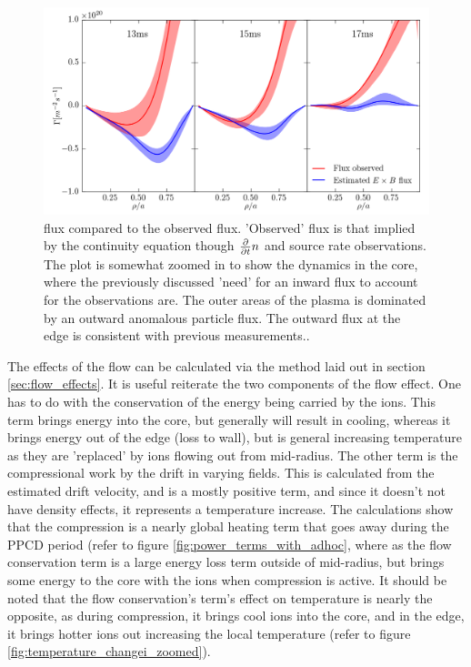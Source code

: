 \begin{figure}
    \centering
    \includegraphics[width=\linewidth]{ion_transport_results/flux_comp.png}
    \caption[\ecb flux compared to measured flux]{\ecb flux compared to the observed flux. 'Observed' flux is that implied by the continuity equation though $\frac{\partial}{\partial t} n$ and source rate observations. The plot is somewhat zoomed in to show the dynamics in the core, where the previously discussed 'need' for an inward flux to account for the observations are. The outer areas of the plasma is dominated by an outward anomalous particle flux. The outward flux at the edge is consistent with previous measurements.\cite{Lanier2001a}. }
    \label{fig:eb_flux}
\end{figure}
The effects of the flow can be calculated via the method laid out in section \ref{sec:flow_effects}. It is useful reiterate the two components of the flow effect. One has to do with the conservation of the energy being carried by the ions. This term brings energy into the core, but generally will result in cooling, whereas it brings energy out of the edge (loss to wall), but is general increasing temperature as they are 'replaced' by ions flowing out from mid-radius. The other term is the compressional work by the \ecb drift in varying fields. This is calculated from the estimated drift velocity, and is a mostly positive term, and since it doesn't not have density effects, it represents a temperature increase. The calculations show that the compression is a nearly global heating term that goes away during the PPCD period (refer to figure \ref{fig:power_terms_with_adhoc}, where as the flow conservation term is a large energy loss term outside of mid-radius, but brings some energy to the core with the ions when compression is active. It should be noted that the flow conservation's term's effect on temperature is nearly the opposite, as during compression, it brings cool ions into the core, and in the edge, it brings hotter ions out increasing the local temperature (refer to figure \ref{fig:temperature_changei_zoomed}).